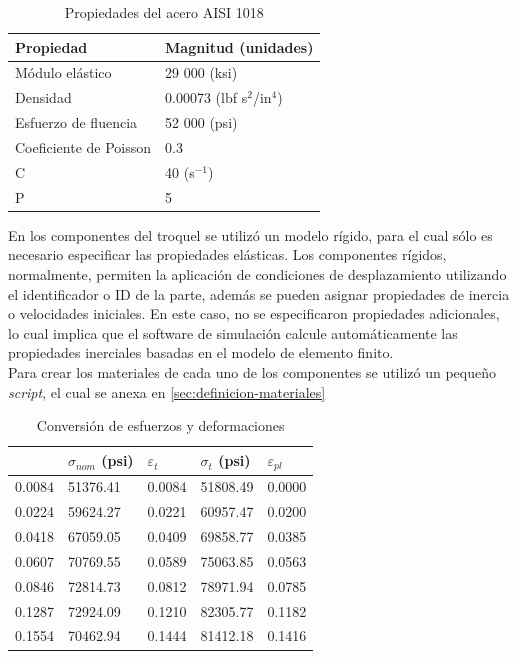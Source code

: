 \begin{table}[h]
\centering
\caption{Propiedades del acero AISI 1018}
\label{tab:steel_properties}
\begin{tabular}{p{4cm} p{4cm}} \hline
Propiedad & Magnitud (unidades) \\
\hline
Módulo elástico & 29 000 (ksi) \\
Densidad & 0.00073 (lbf s$^2$/in$^4$) \\
Esfuerzo de fluencia & 52 000 (psi) \\
Coeficiente de Poisson & 0.3 \\
C & 40 (s$^{-1}$) \\
P & 5 \\
\hline
\end{tabular}
\label{tab:material_properties}
\end{table}

En los componentes del troquel se utilizó un modelo rígido, para el cual sólo es necesario 
especificar las propiedades elásticas. Los componentes rígidos, normalmente, permiten la 
aplicación de condiciones de desplazamiento utilizando el identificador o ID de la parte, además 
se pueden asignar propiedades de inercia o velocidades iniciales. En este caso, no se 
especificaron propiedades adicionales, lo cual implica que el software de simulación calcule automáticamente 
las propiedades inerciales basadas en el modelo de elemento finito. \\

Para crear los materiales de cada uno de los componentes se utilizó un pequeño \textit{script}, el 
cual se anexa en \ref{sec:definicion-materiales}


\begin{table}[h]
\centering
\caption{Conversión de esfuerzos y deformaciones}
\label{tab:strain_stress_conversion}
\begin{tabular}{p{2.5cm} p{2.5cm} p{2.5cm} p{2.5cm} p{2.5cm}} \hline
{\bf $\varepsilon_{nom}$ & $\sigma_{nom}$ (psi) & $\varepsilon_t$ & $\sigma_t$ (psi) & $\varepsilon_{pl}$ } \\
\hline
0.0084 & 51376.41 & 0.0084 & 51808.49 & 0.0000 \\
0.0224 & 59624.27 & 0.0221 & 60957.47 & 0.0200 \\
0.0418 & 67059.05 & 0.0409 & 69858.77 & 0.0385 \\
0.0607 & 70769.55 & 0.0589 & 75063.85 & 0.0563 \\
0.0846 & 72814.73 & 0.0812 & 78971.94 & 0.0785 \\
0.1287 & 72924.09 & 0.1210 & 82305.77 & 0.1182 \\
0.1554 & 70462.94 & 0.1444 & 81412.18 & 0.1416 \\
\hline
\end{tabular}
\label{tab:stress_strain_curve}
\end{table}


